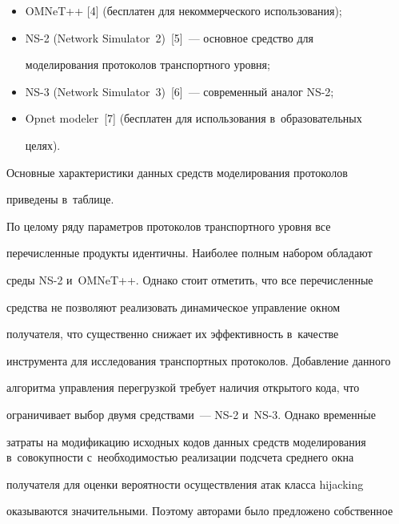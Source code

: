  \begin{itemize}


\item OMNeT++ [4] (бесплатен для некоммерческого использования);


\item NS-2 (Network Simulator~2)~[5]~--- основное средство для


моделирования протоколов транспортного уровня;


\item NS-3 (Network Simulator~3)~[6]~--- современный аналог NS-2;


\item Opnet modeler~[7] (бесплатен для использования в~образовательных


целях).


\end{itemize}





  Основные характеристики данных средств моделирования протоколов


приведены в~таблице.








  По целому ряду параметров протоколов транспортного уровня все


пере\-чис\-лен\-ные продукты идентичны. Наиболее полным набором обладают


среды NS-2 и~OMNeT++. Однако стоит отметить, что все перечисленные


средства не поз\-во\-ля\-ют реализовать динамическое управление окном


получателя, что существенно снижает их эффективность в~качестве


инструмента для исследования транспортных протоколов. Добавление данного


алгоритма управления перегрузкой требует наличия открытого кода, что


ограничивает выбор двумя средствами~--- NS-2 и~NS-3. Однако временн$\acute{\mbox{ы}}$е


затраты на модификацию исходных кодов данных средств моделирования в~совокупности с~необходимостью реализации подсчета среднего окна


получателя для оценки вероятности осуществления атак класса hijacking


оказываются значительными. Поэтому авторами было предложено собственное


